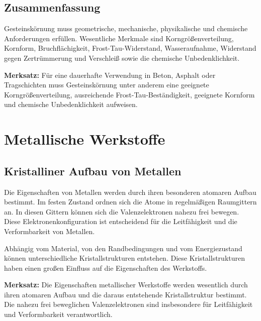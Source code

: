 \documentclass[
  12pt,
  a4paper,
  oneside
]{scrreprt}
\begin{document}
\section{Zusammenfassung}

Gesteinskörnung muss geometrische, mechanische, physikalische und
chemische Anforderungen erfüllen. Wesentliche Merkmale sind
Korngrößenverteilung, Kornform, Bruchflächigkeit, Frost-Tau-Widerstand,
Wasseraufnahme, Widerstand gegen Zertrümmerung und Verschleiß sowie die
chemische Unbedenklichkeit.


\begin{merksatzbox}
\textbf{Merksatz:}
Für eine dauerhafte Verwendung in Beton, Asphalt oder Tragschichten
muss Gesteinskörnung unter anderem eine geeignete Korngrößenverteilung,
ausreichende Frost-Tau-Beständigkeit, geeignete Kornform und
chemische Unbedenklichkeit aufweisen.

\end{merksatzbox}

\chapter{Metallische Werkstoffe}

\section{Kristalliner Aufbau von Metallen}

Die Eigenschaften von Metallen werden durch ihren besonderen atomaren
Aufbau bestimmt. Im festen Zustand ordnen sich die Atome in
regelmäßigen Raumgittern an. In diesen Gittern können sich die
Valenzelektronen nahezu frei bewegen. Diese Elektronenkonfiguration ist
entscheidend für die Leitfähigkeit und die Verformbarkeit von Metallen.


Abhängig vom Material, von den Randbedingungen und vom Energiezustand
können unterschiedliche Kristallstrukturen entstehen. Diese
Kristallstrukturen haben einen großen Einfluss auf die Eigenschaften
des Werkstoffs. 

\begin{merksatzbox}
\textbf{Merksatz:}
Die Eigenschaften metallischer Werkstoffe werden wesentlich durch ihren
atomaren Aufbau und die daraus entstehende Kristallstruktur bestimmt.
Die nahezu frei beweglichen Valenzelektronen sind insbesondere für
Leitfähigkeit und Verformbarkeit verantwortlich.

\end{merksatzbox}
\end{document}
